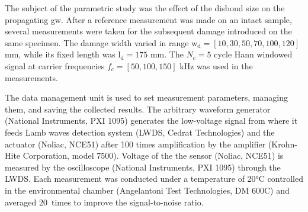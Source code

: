 The subject of the parametric study was the effect of the disbond size on the propagating \ac{gw}.
After a reference measurement was made on an intact sample, several measurements were taken for the subsequent damage introduced on the same specimen.
The damage width varied in range \(\mathrm{w_d}=\left [10, 30, 50, 70, 100, 120 \right ]\) \unit{\mm}, while its fixed length was \(\mathrm{l_d} = 175\) \unit{\mm}.
%
%
The \(N_c=5\) cycle Hann windowed signal at carrier frequencies \(f_c=[50,100,150]\) \unit{\kHz} was used in the measurements.

The data management unit is used to set measurement parameters, managing them, and saving the collected results.
The arbitrary waveform generator (National Instruments, PXI 1095) generates the low-voltage signal from where it feeds Lamb waves detection system (LWDS, Cedrat Technologies) and the actuator (Noliac, NCE51) after 100 times amplification by the  amplifier (Krohn-Hite Corporation, model 7500).
Voltage of the the sensor (Noliac, NCE51) is measured by the oscilloscope (National Instruments, PXI 1095) through the LWDS.
Each measurement was conducted under a temperature of 20\unit{\degreeCelsius} controlled in the environmental chamber (Angelantoni Test Technologies, DM 600C) and averaged 20~times to improve the signal-to-noise ratio.
